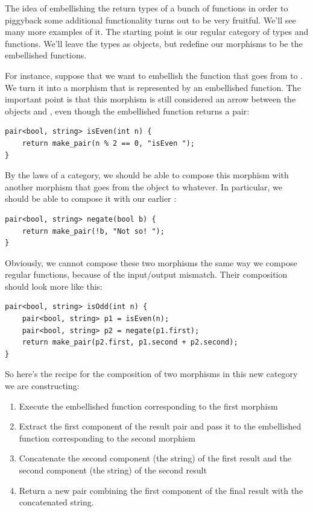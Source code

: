 The idea of embellishing the return types of a bunch of functions in
order to piggyback some additional functionality turns out to be very
fruitful. We'll see many more examples of it. The starting point is our
regular category of types and functions. We'll leave the types as
objects, but redefine our morphisms to be the embellished functions.

For instance, suppose that we want to embellish the function
 that goes from  to . We turn it
into a morphism that is represented by an embellished function. The
important point is that this morphism is still considered an arrow
between the objects  and , even though the
embellished function returns a pair:

\begin{Verbatim}
pair<bool, string> isEven(int n) {
    return make_pair(n % 2 == 0, "isEven ");
}
\end{Verbatim}
By the laws of a category, we should be able to compose this morphism
with another morphism that goes from the object  to
whatever. In particular, we should be able to compose it with our
earlier :

\begin{Verbatim}
pair<bool, string> negate(bool b) {
    return make_pair(!b, "Not so! ");
}
\end{Verbatim}
Obviously, we cannot compose these two morphisms the same way we compose
regular functions, because of the input/output mismatch. Their
composition should look more like this:

\begin{Verbatim}
pair<bool, string> isOdd(int n) {
    pair<bool, string> p1 = isEven(n);
    pair<bool, string> p2 = negate(p1.first);
    return make_pair(p2.first, p1.second + p2.second);
}
\end{Verbatim}
So here's the recipe for the composition of two morphisms in this new
category we are constructing:

\begin{enumerate}
\tightlist
\item
  Execute the embellished function corresponding to the first morphism
\item
  Extract the first component of the result pair and pass it to the
  embellished function corresponding to the second morphism
\item
  Concatenate the second component (the string) of the first result
  and the second component (the string) of the second result
\item
  Return a new pair combining the first component of the final result
  with the concatenated string.
\end{enumerate}

